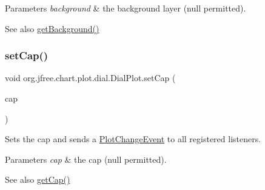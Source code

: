 \begin{DoxyParams}{Parameters}
{\em background} & the background layer ({\ttfamily null} permitted).\\
\hline
\end{DoxyParams}
\begin{DoxySeeAlso}{See also}
\mbox{\hyperlink{classorg_1_1jfree_1_1chart_1_1plot_1_1dial_1_1_dial_plot_abe1006904f1a489ca3f4e53f1cad953c}{get\+Background()}} 
\end{DoxySeeAlso}
\mbox{\label{classorg_1_1jfree_1_1chart_1_1plot_1_1dial_1_1_dial_plot_a895fa9fbd692fdac0884f21e809871a5}} 
\subsubsection{\texorpdfstring{set\+Cap()}{setCap()}}
{\footnotesize\ttfamily void org.\+jfree.\+chart.\+plot.\+dial.\+Dial\+Plot.\+set\+Cap (\begin{DoxyParamCaption}\item[{\mbox{\hyperlink{interfaceorg_1_1jfree_1_1chart_1_1plot_1_1dial_1_1_dial_layer}{Dial\+Layer}}}]{cap }\end{DoxyParamCaption})}

Sets the cap and sends a \mbox{\hyperlink{}{Plot\+Change\+Event}} to all registered listeners.


\begin{DoxyParams}{Parameters}
{\em cap} & the cap ({\ttfamily null} permitted).\\
\hline
\end{DoxyParams}
\begin{DoxySeeAlso}{See also}
\mbox{\hyperlink{classorg_1_1jfree_1_1chart_1_1plot_1_1dial_1_1_dial_plot_a4bfa1709db2fe99136ddcf2ee890c0ef}{get\+Cap()}} 
\end{DoxySeeAlso}
\mbox{\label{classorg_1_1jfree_1_1chart_1_1plot_1_1dial_1_1_dial_plot_a34b44b646474f3831881c85f8c04e1bf}} 
